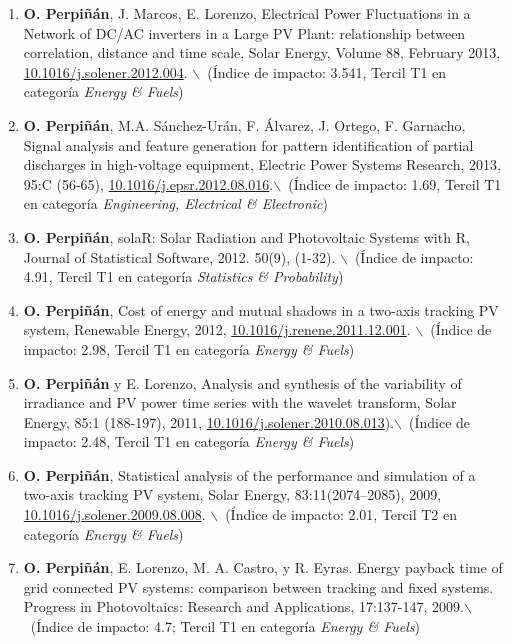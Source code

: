 \documentclass[article, a4paper]{memoir}
\begin{document}
\begin{enumerate}
\item \textbf{O. Perpiñán}, J. Marcos, E. Lorenzo, Electrical Power Fluctuations in a Network of DC/AC inverters in a Large PV Plant: relationship between correlation, distance and time scale, Solar Energy, Volume 88, February 2013, \href{http://dx.doi.org/10.1016/j.solener.2012.12.004}{10.1016/j.solener.2012.004}. $\backslash$\ (Índice de impacto: 3.541, Tercil T1 en categoría \emph{Energy \& Fuels})

\item \textbf{O. Perpiñán}, M.A. Sánchez-Urán, F. Álvarez, J. Ortego, F. Garnacho, Signal analysis and feature generation for pattern identification of partial discharges in high-voltage equipment, Electric Power Systems Research, 2013, 95:C (56-65), \href{http://dx.doi.org/10.1016/j.epsr.2012.08.016}{10.1016/j.epsr.2012.08.016}.$\backslash$\ (Índice de impacto: 1.69, Tercil T1 en categoría \emph{Engineering, Electrical \& Electronic})

\item \textbf{O. Perpiñán}, solaR: Solar Radiation and Photovoltaic Systems with R, Journal of Statistical Software, 2012. 50(9), (1-32). $\backslash$\ (Índice de impacto: 4.91, Tercil T1 en categoría \emph{Statistics \& Probability})

\item \textbf{O. Perpiñán}, Cost of energy and mutual shadows in a two-axis tracking PV system, Renewable Energy, 2012, \href{http://dx.doi.org/10.1016/j.renene.2011.12.001}{10.1016/j.renene.2011.12.001}. $\backslash$\ (Índice de impacto: 2.98, Tercil T1 en categoría \emph{Energy \& Fuels})

\item \textbf{O. Perpiñán} y E. Lorenzo, Analysis and synthesis of the variability of irradiance and PV power time series with the wavelet transform, Solar Energy, 85:1 (188-197), 2011, \href{http://dx.doi.org/10.1016/j.solener.2010.08.013}{10.1016/j.solener.2010.08.013}).$\backslash$\ (Índice de impacto: 2.48, Tercil T1 en categoría \emph{Energy \& Fuels})

\item \textbf{O. Perpiñán}, Statistical analysis of the performance and simulation of a two-axis tracking PV system, Solar Energy, 83:11(2074–2085), 2009, \href{http://dx.doi.org/10.1016/j.solener.2009.08.008}{10.1016/j.solener.2009.08.008}. $\backslash$\ (Índice de impacto: 2.01, Tercil T2 en categoría \emph{Energy \& Fuels})

\item \textbf{O. Perpiñán}, E. Lorenzo, M. A. Castro, y R. Eyras. Energy payback time of grid connected PV systems: comparison between tracking and fixed systems. Progress in Photovoltaics: Research and Applications, 17:137-147, 2009.$\backslash$\ (Índice de impacto: 4.7; Tercil T1 en categoría \emph{Energy \& Fuels})


\end{enumerate}
\end{document}
